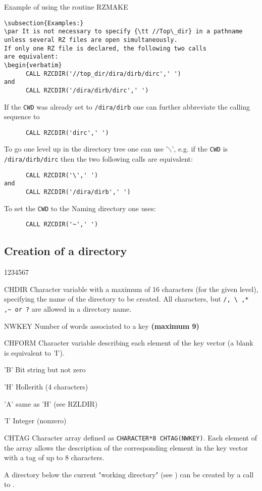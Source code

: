 \begin{XMPt}{Example of using the routine RZMAKE}
\begin{verbatim}
\subsection{Examples:}
\par It is not necessary to specify {\tt //Top\_dir} in a pathname
unless several RZ files are open simultaneously.
If only one RZ file is declared, the following two calls
are equivalent:
\begin{verbatim}
      CALL RZCDIR('//top_dir/dira/dirb/dirc',' ')
and
      CALL RZCDIR('/dira/dirb/dirc',' ')
\end{verbatim}
\par If the {\tt CWD} was already set to {\tt /dira/dirb}
one can further abbreviate
the calling sequence to
\begin{verbatim}
      CALL RZCDIR('dirc',' ')
\end{verbatim}
\par To go one level up in the directory tree one can use '$\backslash$', e.g.
if the {\tt CWD} is {\tt /dira/dirb/dirc}
then the two following calls are equivalent:
\begin{verbatim}
      CALL RZCDIR('\',' ')
and
      CALL RZCDIR('/dira/dirb',' ')
\end{verbatim}
To set the {\tt CWD} to the Naming directory one uses:
\begin{verbatim}
      CALL RZCDIR('~',' ')
\end{verbatim}
\subsection{Creation of a directory}
\Idesc
\begin{DLtt}{1234567}
\item[CHDIR]Character variable with a maximum of 16 characters (for the given
level), specifying the name of the directory to be
created. All characters, but \verb!/, \ ,* ,~ or ?!
are allowed in a directory name.
\item[NWKEY]Number of words associated to a key {\bf (maximum 9)}
\item[CHFORM]Character variable describing each element of the key vector
(a blank is equivalent to 'I').
\begin{DLtt}{12}
\item['B']Bit string but not zero
\item['H']Hollerith (4 characters)
\item['A']same as 'H' (see RZLDIR)
\item['I']Integer (nonzero)
\end{DLtt}
\item[CHTAG]Character array defined as {\tt CHARACTER*8 CHTAG(NWKEY)}.
\newline
Each element of the array allows the description of the corresponding
element in the key vector with a tag of up to 8 characters.
\end{DLtt}
\par 
A directory below the current "working directory" (see )
can be created by a call to .

\end{XMPt}

